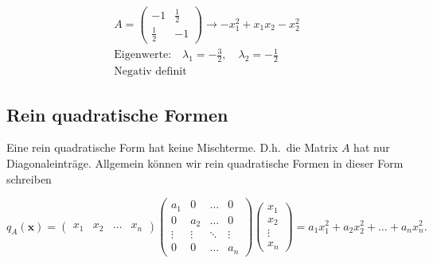 \begin{figure}[h]
    \centering
    \begin{minipage}{0.39\textwidth}
        \centering
    \end{minipage}
    \hfill
    \begin{minipage}{0.6\textwidth}
        \begin{equation*}
            \begin{aligned}
                A = \begin{pmatrix} -1 & \frac{1}{2} \\ \frac{1}{2} & -1 \end{pmatrix} \rightarrow -x_1^2 + x_1x_2 - x_2^2 \\[0.5em]
                \text{Eigenwerte:} \quad \lambda_1 = - \frac{3}{2}, \quad \lambda_2 = - \frac{1}{2} \\[0.5em]
                \text{Negativ definit} \qquad \qquad
            \end{aligned}
        \end{equation*}
    \end{minipage}
\end{figure}

\subsection{Rein quadratische Formen}

Eine rein quadratische Form hat keine Mischterme. D.h.\ die Matrix \( A \)  hat nur Diagonaleinträge. Allgemein können wir rein quadratische Formen in dieser Form schreiben

\begin{equation*}
    q_A(\mathbf{x}) = \begin{pmatrix} x_1 & x_2 & \dots & x_n \end{pmatrix} \begin{pmatrix} a_1 & 0 & \dots & 0 \\ 0 & a_2 & \dots & 0 \\ \vdots & \vdots & \ddots & \vdots \\ 0 & 0 & \dots & a_n \end{pmatrix} \begin{pmatrix} x_1 \\ x_2 \\ \vdots \\ x_n \end{pmatrix} = a_1x_1^2 + a_2x_2^2 + \dots + a_nx_n^2.
\end{equation*}

